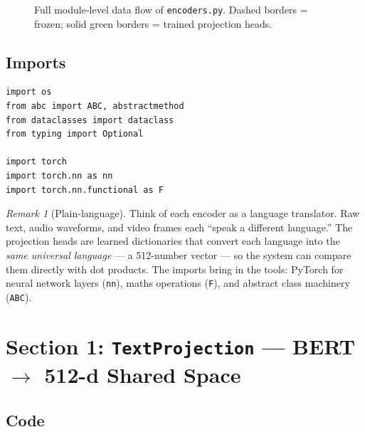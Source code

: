 \documentclass[12pt,a4paper]{article}
\theoremstyle{definition}
\theoremstyle{remark}
\newtheorem{remark}[theorem]{Remark}
\begin{document}
\begin{figure}[H]
\caption{Full module-level data flow of \texttt{encoders.py}.
Dashed borders = frozen; solid green borders = trained projection heads.}
\label{fig:module_flow}
\end{figure}

\subsection{Imports}

\begin{lstlisting}[caption={Module-level imports}]
import os
from abc import ABC, abstractmethod
from dataclasses import dataclass
from typing import Optional

import torch
import torch.nn as nn
import torch.nn.functional as F
\end{lstlisting}

\begin{remark}[Plain-language]
Think of each encoder as a language translator.
Raw text, audio waveforms, and video frames each ``speak a different language.''
The projection heads are learned dictionaries that convert each language into the
\emph{same universal language} — a 512-number vector — so the system can
compare them directly with dot products.
The imports bring in the tools: PyTorch for neural network layers (\texttt{nn}),
maths operations (\texttt{F}), and abstract class machinery (\texttt{ABC}).
\end{remark}

\section{Section 1: \texttt{TextProjection} — BERT $\to$ 512-d Shared Space}

\subsection{Code}
\end{document}
